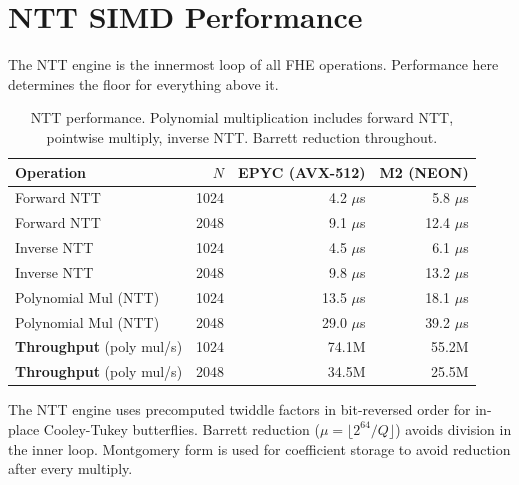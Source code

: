 \section{NTT SIMD Performance}


The NTT engine is the innermost loop of all FHE operations. Performance here determines the floor for everything above it.

\begin{table}[h]
\centering
\begin{tabular}{@{}lrrr@{}}
\toprule
\textbf{Operation} & \textbf{$N$} & \textbf{EPYC (AVX-512)} & \textbf{M2 (NEON)} \\
\midrule
Forward NTT & 1024 & 4.2 $\mu$s & 5.8 $\mu$s \\
Forward NTT & 2048 & 9.1 $\mu$s & 12.4 $\mu$s \\
Inverse NTT & 1024 & 4.5 $\mu$s & 6.1 $\mu$s \\
Inverse NTT & 2048 & 9.8 $\mu$s & 13.2 $\mu$s \\
Polynomial Mul (NTT) & 1024 & 13.5 $\mu$s & 18.1 $\mu$s \\
Polynomial Mul (NTT) & 2048 & 29.0 $\mu$s & 39.2 $\mu$s \\
\midrule
\textbf{Throughput} (poly mul/s) & 1024 & 74.1M & 55.2M \\
\textbf{Throughput} (poly mul/s) & 2048 & 34.5M & 25.5M \\
\bottomrule
\end{tabular}
\caption{NTT performance. Polynomial multiplication includes forward NTT, pointwise multiply, inverse NTT. Barrett reduction throughout.}
\label{tab:ntt}
\end{table}

The NTT engine uses precomputed twiddle factors in bit-reversed order for in-place Cooley-Tukey butterflies. Barrett reduction ($\mu = \lfloor 2^{64}/Q \rfloor$) avoids division in the inner loop. Montgomery form is used for coefficient storage to avoid reduction after every multiply.

